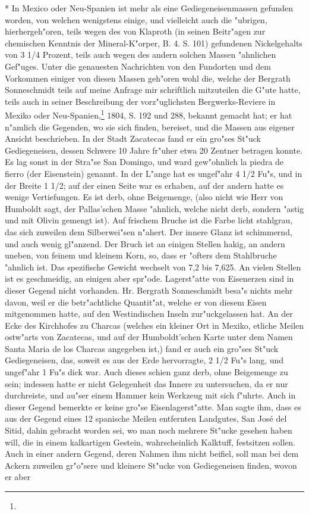 \documentclass[a4paper, 11pt, oneside, polutonikogreek, german]{article}
\begin{document}
* In Mexico oder Neu-Spanien ist mehr als eine Gediegeneisenmassen gefunden worden, von welchen wenigstens einige, und vielleicht auch die "ubrigen, hierhergeh"oren, teils wegen des von Klaproth (in seinen Beitr"agen zur chemischen Kenntnis der Mineral-K"orper, B. 4. S. 101) gefundenen Nickelgehalts von 3 1/4 Prozent, teils auch wegen des andern solchen Massen "ahnlichen Gef"uges. Unter die genauesten Nachrichten von den Fundorten und dem Vorkommen einiger von diesen Massen geh"oren wohl die, welche der Bergrath Sonneschmidt teils auf meine Anfrage mir schriftlich mitzuteilen die G"ute hatte, teils auch in seiner Beschreibung der vorz"uglichsten Bergwerks-Reviere in Mexiko oder Neu-Spanien,\footnote{} 1804, S. 192 und 288, bekannt gemacht hat; er hat n"amlich die Gegenden, wo sie sich finden, bereiset, und die Massen aus eigener Ansicht beschrieben. In der Stadt Zacatecas fand er ein gro"ses St"uck Gediegeneisen, dessen Schwere 10 Jahre fr"uher etwa 20 Zentner betragen konnte. Es lag sonst in der Stra"se San Domingo, und ward gew"ohnlich la piedra de fierro (der Eisenstein) genannt. In der L"ange hat es ungef"ahr 4 1/2 Fu"s, und in der Breite 1 1/2; auf der einen Seite war es erhaben, auf der andern hatte es wenige Vertiefungen. Es ist derb, ohne Beigemenge, (also nicht wie Herr von Humboldt sagt, der Pallas'schen Masse "ahnlich, welche nicht derb, sondern "astig und mit Olivin gemengt ist). Auf frischem Bruche ist die Farbe licht stahlgrau, das sich zuweilen dem Silberwei"sen n"ahert. Der innere Glanz ist schimmernd, und auch wenig gl"anzend. Der Bruch ist an einigen Stellen hakig, an andern uneben, von feinem und kleinem Korn, so, dass er "ofters dem Stahlbruche "ahnlich ist. Das spezifische Gewicht wechselt von 7,2 bis 7,625. An vielen Stellen ist es geschmeidig, an einigen aber spr"ode. Lagerst"atte von Eisenerzen sind in dieser Gegend nicht vorhanden. Hr. Bergrath Sonneschmidt besa"s nichts mehr davon, weil er die betr"achtliche Quantit"at, welche er von diesem Eisen mitgenommen hatte, auf den Westindischen Inseln zur"uckgelassen hat. An der Ecke des Kirchhofes zu Charcas (welches ein kleiner Ort in Mexiko, etliche Meilen ostw"arts von Zacatecas, und auf der Humboldt'schen Karte unter dem Namen Santa Maria de los Charcas angegeben ist,) fand er auch ein gro"ses St"uck Gediegeneisen, das, soweit es aus der Erde hervorragte, 2 1/2 Fu"s lang, und ungef"ahr 1 Fu"s dick war. Auch dieses schien ganz derb, ohne Beigemenge zu sein; indessen hatte er nicht Gelegenheit das Innere zu untersuchen, da er nur durchreiste, und au"ser einem Hammer kein Werkzeug mit sich f"uhrte. Auch in dieser Gegend bemerkte er keine gro"se Eisenlagerst"atte. Man sagte ihm, dass es aus der Gegend eines 12 spanische Meilen entfernten Landgutes, San José del Sitid, dahin gebracht worden sei, wo man noch mehrere St"ucke gesehen haben will, die in einem kalkartigen Gestein, wahrscheinlich Kalktuff, festsitzen sollen. Auch in einer andern Gegend, deren Nahmen ihm nicht beifiel, soll man bei dem Ackern zuweilen gr"o"sere und kleinere St"ucke von Gediegeneisen finden, wovon er aber 
\end{document}
